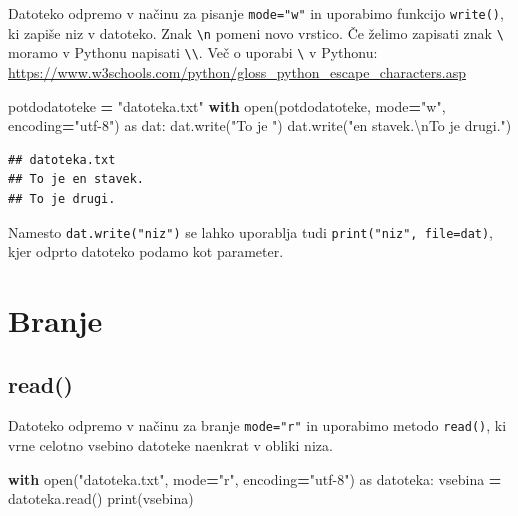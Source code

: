 \documentclass[
]{book}
\newenvironment{Shaded}{\begin{snugshade}}{\end{snugshade}}
\newcommand{\BuiltInTok}[1]{#1}
\newcommand{\CharTok}[1]{\textcolor[rgb]{0.31,0.60,0.02}{#1}}
\newcommand{\ControlFlowTok}[1]{\textcolor[rgb]{0.13,0.29,0.53}{\textbf{#1}}}
\newcommand{\ImportTok}[1]{#1}
\newcommand{\NormalTok}[1]{#1}
\newcommand{\OperatorTok}[1]{\textcolor[rgb]{0.81,0.36,0.00}{\textbf{#1}}}
\newcommand{\StringTok}[1]{\textcolor[rgb]{0.31,0.60,0.02}{#1}}
\begin{document}
Datoteko odpremo v načinu za pisanje \texttt{mode="w"} in uporabimo funkcijo \texttt{write()},
ki zapiše niz v datoteko. Znak \texttt{\textbackslash{}n} pomeni novo vrstico. Če želimo zapisati znak \texttt{\textbackslash{}}
moramo v Pythonu napisati \texttt{\textbackslash{}\textbackslash{}}. Več o uporabi \texttt{\textbackslash{}} v Pythonu: \url{https://www.w3schools.com/python/gloss_python_escape_characters.asp}

\begin{Shaded}
\begin{Highlighting}[]
\NormalTok{potdodatoteke }\OperatorTok{=} \StringTok{"datoteka.txt"}
\ControlFlowTok{with} \BuiltInTok{open}\NormalTok{(potdodatoteke, mode}\OperatorTok{=}\StringTok{"w"}\NormalTok{, encoding}\OperatorTok{=}\StringTok{"utf{-}8"}\NormalTok{) }\ImportTok{as}\NormalTok{ dat:}
\NormalTok{    dat.write(}\StringTok{"To je "}\NormalTok{)}
\NormalTok{    dat.write(}\StringTok{"en stavek.}\CharTok{\textbackslash{}n}\StringTok{To je drugi."}\NormalTok{)}
\end{Highlighting}
\end{Shaded}

\begin{verbatim}
## datoteka.txt
## To je en stavek.
## To je drugi.
\end{verbatim}

Namesto \texttt{dat.write("niz")} se lahko uporablja tudi \texttt{print("niz",\ file=dat)}, kjer
odprto datoteko podamo kot parameter.

\hypertarget{branje}{%
\section{Branje}\label{branje}}

\hypertarget{read}{%
\subsection{read()}\label{read}}

Datoteko odpremo v načinu za branje \texttt{mode="r"} in uporabimo metodo \texttt{read()},
ki vrne celotno vsebino datoteke naenkrat v obliki niza.

\begin{Shaded}
\begin{Highlighting}[]
\ControlFlowTok{with} \BuiltInTok{open}\NormalTok{(}\StringTok{"datoteka.txt"}\NormalTok{, mode}\OperatorTok{=}\StringTok{"r"}\NormalTok{, encoding}\OperatorTok{=}\StringTok{"utf{-}8"}\NormalTok{) }\ImportTok{as}\NormalTok{ datoteka:}
\NormalTok{    vsebina }\OperatorTok{=}\NormalTok{ datoteka.read()}
\BuiltInTok{print}\NormalTok{(vsebina)}
\end{Highlighting}
\end{Shaded}
\end{document}
